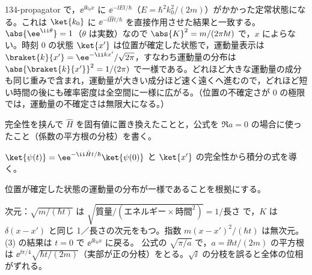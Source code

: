 \documentclass[uplatex,dvipdfmx,a4paper,11pt]{jsarticle}
\begin{document}
\begin{kaisetsu}{134-propagator}
で，$\ee^{\ii k_{0}x}$ に $\ee^{-\ii Et/\hbar}$（$E=\hbar^{2}k_{0}^{2}/(2m)$）がかかった定常状態になる。これは $\ket{k_{0}}$ に $\ee^{-\ii\hat{H}t/\hbar}$ を直接作用させた結果と一致する。
 $\abs{\ee^{\ii\theta}}=1$（$\theta$ は実数）なので $\abs{K}^{2}=m/(2\pi\hbar t)$ で，$x$ によらない。時刻 $0$ の状態 $\ket{x'}$ は位置が確定した状態で，運動量表示は $\braket{k}{x'}=\ee^{-\ii kx'}/\sqrt{2\pi}$，すなわち運動量の分布は $\abs{\braket{k}{x'}}^{2}=1/(2\pi)$ で一様である。どれほど大きな運動量の成分も同じ重みで含まれ，運動量が大きい成分ほど速く遠くへ進むので，どれほど短い時間の後にも確率密度は全空間に一様に広がる。（位置の不確定さが $0$ の極限では，運動量の不確定さは無限大になる。）
\begin{ronten}
  \item {} 完全性を挟んで $\hat{H}$ を固有値に置き換えたことと，公式を $\Re a=0$ の場合に使ったこと（係数の平方根の分枝）を書く。
  \item {} $\ket{\psi(t)}=\ee^{-\ii\hat{H}t/\hbar}\ket{\psi(0)}$ と $\ket{x'}$ の完全性から積分の式を導く。
  \item {} 位置が確定した状態の運動量の分布が一様であることを根拠にする。
\end{ronten}
\kenzan 次元：$\sqrt{m/(\hbar t)}$ は $\sqrt{\text{質量}/(\text{エネルギー}\times\text{時間}^{2})}=1/\text{長さ}$ で，$K$ は $\delta(x-x')$ と同じ 1／長さの次元をもつ。指数 $m(x-x')^{2}/(\hbar t)$ は無次元。(3) の結果は $t=0$ で $\ee^{\ii k_{0}x}$ に戻る。
\tsumazuki 公式の $\sqrt{\pi/a}$ で，$a=\ii\hbar t/(2m)$ の平方根は $\ee^{\ii\pi/4}\sqrt{\hbar t/(2m)}$（実部が正の分枝）をとる。$\sqrt{\ii}$ の分枝を誤ると全体の位相がずれる。
\end{kaisetsu}
\end{document}
